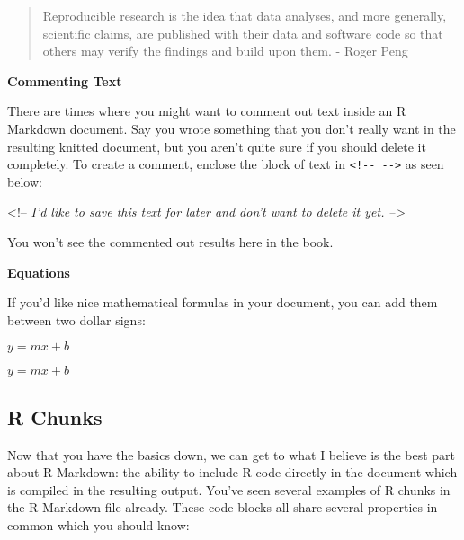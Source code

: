 \documentclass[]{tufte-book}
\newenvironment{Shaded}{\begin{snugshade}}{\end{snugshade}}
\newcommand{\CommentTok}[1]{\textcolor[rgb]{0.56,0.35,0.01}{\textit{#1}}}
\newcommand{\NormalTok}[1]{#1}
\begin{document}
\begin{quote}
Reproducible research is the idea that data analyses, and more generally, scientific claims, are published with their data and software code so that others may verify the findings and build upon them. - Roger Peng
\end{quote}

\textbf{Commenting Text}

There are times where you might want to comment out text inside an R Markdown document. Say you wrote something that you don't really want in the resulting knitted document, but you aren't quite sure if you should delete it completely. To create a comment, enclose the block of text in \texttt{\textless{}!-\/-\ -\/-\textgreater{}} as seen below:

\begin{Shaded}
\begin{Highlighting}[]
\NormalTok{<!--}
\CommentTok{I'd like to save this text for later and don't want to delete it yet.}
\CommentTok{-->}
\end{Highlighting}
\end{Shaded}

You won't see the commented out results here in the book.

\vspace*{0.2in}

\noindent\textbf{Equations}\vspace*{0.1in}

If you'd like nice mathematical formulas in your document, you can add them between two dollar signs:

\begin{Shaded}
\begin{Highlighting}[]
\NormalTok{$y = mx + b$}
\end{Highlighting}
\end{Shaded}

\(y = mx + b\)

\hypertarget{r-chunks}{%
\subsection{R Chunks}\label{r-chunks}}

Now that you have the basics down, we can get to what I believe is the best part about R Markdown: the ability to include R code directly in the document which is compiled in the resulting output. You've seen several examples of R chunks in the R Markdown file already. These code blocks all share several properties in common which you should know:
\end{document}

